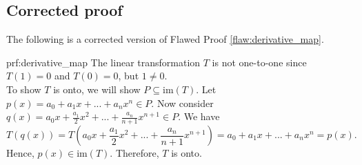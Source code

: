 \clearpage
\subsection{Corrected proof}

The following is a corrected version of Flawed Proof \ref{flaw:derivative_map}. %

\begin{prf}{prf:derivative_map} %
The linear transformation $T$ is not one-to-one since $T(1) = 0$ and $T(0) = 0$, but $1 \neq 0$. \\

To show $T$ is onto, we will show $P\subseteq \mathrm{im}(T)$. Let $p(x)=a_0 + a_1x + ... + a_nx^n \in P$. Now consider $q(x) = a_0x + \frac{a_1}{2}x^2 + ... + \frac{a_n}{n+1}x^{n+1}\in P$. We have \[T(q(x)) = T(a_0x + \frac{a_1}{2}x^2 + ... + \frac{a_n}{n+1}x^{n+1}) = a_0 + a_1x + ... + a_nx^n = p(x).\] Hence, $p(x)\in\mathrm{im}(T)$. Therefore, $T$ is onto.
\end{prf} 
